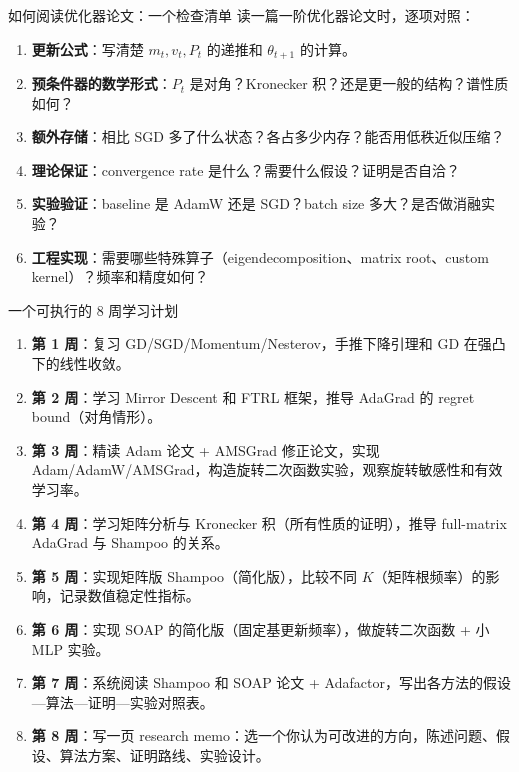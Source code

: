 \documentclass[aspectratio=169,10pt]{ctexbeamer}
\begin{document}
\begin{frame}{如何阅读优化器论文：一个检查清单}
读一篇一阶优化器论文时，逐项对照：
\begin{enumerate}
  \item \textbf{更新公式}：写清楚 $m_t,v_t,P_t$ 的递推和 $\theta_{t+1}$ 的计算。
  \item \textbf{预条件器的数学形式}：$P_t$ 是对角？Kronecker 积？还是更一般的结构？谱性质如何？
  \item \textbf{额外存储}：相比 SGD 多了什么状态？各占多少内存？能否用低秩近似压缩？
  \item \textbf{理论保证}：convergence rate 是什么？需要什么假设？证明是否自洽？
  \item \textbf{实验验证}：baseline 是 AdamW 还是 SGD？batch size 多大？是否做消融实验？
  \item \textbf{工程实现}：需要哪些特殊算子（eigendecomposition、matrix root、custom kernel）？频率和精度如何？
\end{enumerate}
\end{frame}

\begin{frame}{一个可执行的 8 周学习计划}
\begin{enumerate}
  \item \textbf{第 1 周}：复习 GD/SGD/Momentum/Nesterov，手推下降引理和 GD 在强凸下的线性收敛。
  \item \textbf{第 2 周}：学习 Mirror Descent 和 FTRL 框架，推导 AdaGrad 的 regret bound（对角情形）。
  \item \textbf{第 3 周}：精读 Adam 论文 + AMSGrad 修正论文，实现 Adam/AdamW/AMSGrad，构造旋转二次函数实验，观察旋转敏感性和有效学习率。
  \item \textbf{第 4 周}：学习矩阵分析与 Kronecker 积（所有性质的证明），推导 full-matrix AdaGrad 与 Shampoo 的关系。
  \item \textbf{第 5 周}：实现矩阵版 Shampoo（简化版），比较不同 $K$（矩阵根频率）的影响，记录数值稳定性指标。
  \item \textbf{第 6 周}：实现 SOAP 的简化版（固定基更新频率），做旋转二次函数 + 小 MLP 实验。
  \item \textbf{第 7 周}：系统阅读 Shampoo 和 SOAP 论文 + Adafactor，写出各方法的假设—算法—证明—实验对照表。
  \item \textbf{第 8 周}：写一页 research memo：选一个你认为可改进的方向，陈述问题、假设、算法方案、证明路线、实验设计。
\end{enumerate}
\end{frame}
\end{document}
